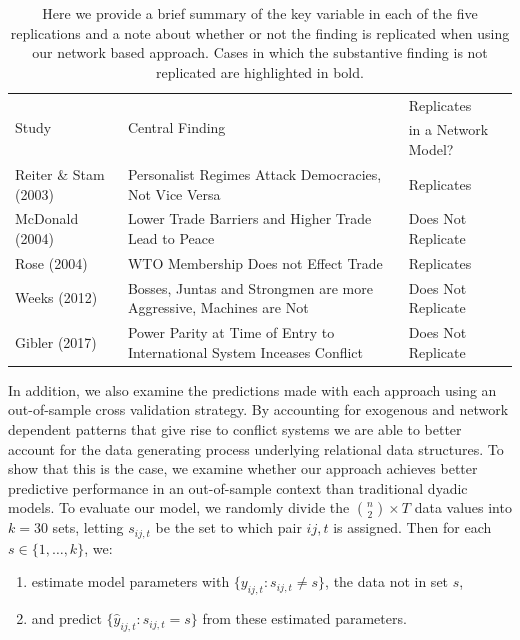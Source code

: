 \begin{table}[ht]
\centering
\caption{Here we provide a brief summary of the key variable in each of the five replications and a note about whether or not the finding is replicated when using our network based approach. Cases in which the substantive finding is not replicated are highlighted in bold.}
	\begin{tabular}{l p{7cm} l} \toprule
		\multirow{2}{*}{Study} & \multirow{2}{*}{Central Finding} &  Replicates \\ 
			& &  in a Network Model? \\ \toprule
		Reiter \& Stam (2003) & Personalist Regimes Attack Democracies, Not Vice Versa & {Replicates} \\ \midrule
		McDonald (2004) & Lower Trade Barriers and Higher Trade Lead to Peace & {Does Not Replicate}\\ \midrule
		Rose (2004) & WTO Membership Does not Effect Trade & {Replicates}\\ \midrule
		Weeks (2012) & Bosses, Juntas and Strongmen are more Aggressive, Machines are Not & {Does Not Replicate} \\\midrule
		Gibler (2017) & Power Parity at Time of Entry to International System Inceases Conflict & {Does Not Replicate} \\ \bottomrule
	\end{tabular}
	\label{tab:modelFindingSumm}
\end{table}

In addition, we also examine the predictions made with each approach using an out-of-sample cross validation strategy. By accounting for exogenous and network dependent patterns that give rise to conflict systems we are able to better account for the data generating process underlying relational data structures. To show that this is the case, we examine whether our approach achieves better predictive performance in an out-of-sample context than traditional dyadic models. To evaluate our model, we randomly divide the $\binom n 2 \times T$ data values into $k=30$ sets, letting $s_{ij,t}$ be the set to which pair $ij,t$ is assigned. Then for each $s \in \{1,\ldots,k\}$, we:

\begin{enumerate}
	\item estimate model parameters with $\{y_{ij,t}: s_{ij,t} \neq s\}$, the data not in set $s$,
	\item and predict $\{\hat{y}_{ij,t}: s_{ij,t} = s\}$ from these estimated parameters. 
\end{enumerate}

